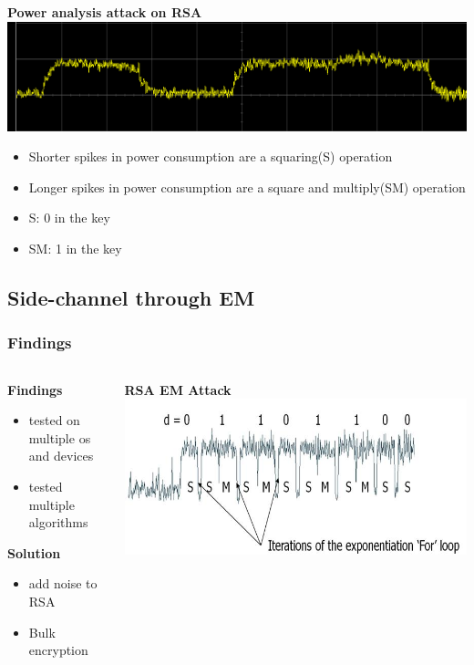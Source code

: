 \documentclass{beamer}
\begin{document}
		\begin{frame}
			\textbf{Power analysis attack on RSA}
		  \includegraphics[width= \textwidth]{Images/Power_attack.png} 
		  \begin{itemize}
		  \item Shorter spikes in power consumption are a squaring(S) operation
		  \item Longer spikes in power consumption are a square and multiply(SM) operation
		  \item S: 0 in the key
		  \item SM: 1 in the key
		  \end{itemize}
		\end{frame}
	\subsection{Side-channel through EM}
		
		\begin{frame}
		\frametitle{Findings}
		\begin{columns}[T]
		\begin{column}{.45\textwidth}
		\textbf{Findings}
		\begin{itemize}
		\item tested on multiple os and devices
		\item tested multiple algorithms
		\end{itemize}
		\textbf{Solution}
		\begin{itemize}
		\item add noise to RSA
		\item Bulk encryption
		\end{itemize}
		 
		
		\end{column}
		\begin{column}{.45\textwidth}
		\textbf{RSA EM Attack}
		\includegraphics[scale=.3]{Images/RSA.jpg}
		\end{column}
		\end{columns}
	
		
			
		\end{frame}
\end{document}

